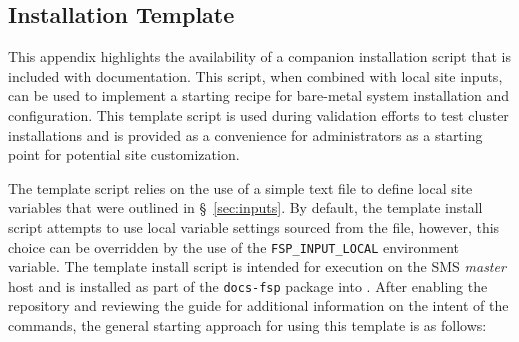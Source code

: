 \subsection{Installation Template}  \label{appendix:template_script}

This appendix highlights the availability of a companion installation script
that is included with \FSP{} documentation.  This script, when combined with
local site inputs, can be used to implement a starting recipe for
bare-metal system installation and configuration. This template script is used
during validation efforts to test cluster installations and is provided as a
convenience for administrators as a starting point for potential site
customization. 

The template script relies on the use of a simple text file to
define local site variables that were outlined in \S~\ref{sec:inputs}.
By default, the template install script attempts to use local variable settings
sourced from the  file,
however, this choice can be overridden by the use of the
\texttt{FSP\_INPUT\_LOCAL} environment variable. The template install script is
intended for execution on the SMS {\em master} host and is installed as part of
the \texttt{docs-fsp} package into .
After enabling the \FSP{} repository and reviewing the guide for additional information on the intent of the
commands, the general starting approach for using this template is as follows:

